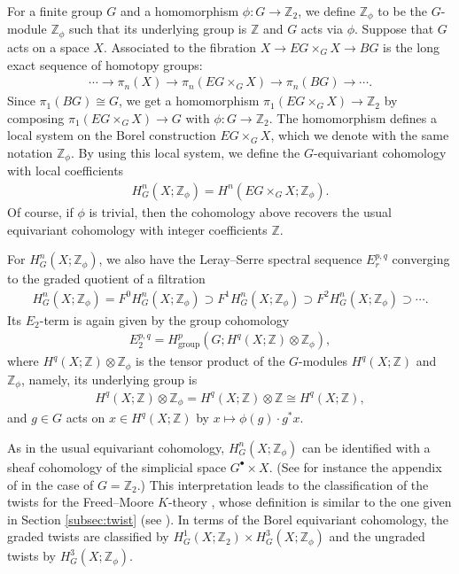 \documentclass[pdftex]{sigma}
\theoremstyle{definition}
\newcommand{\Z}{\mathbb{Z}}
\begin{document}
For a f\/inite group $G$ and a homomorphism $\phi \colon G \to \Z_2$, we def\/ine $\Z_\phi$ to be the $G$-module $\Z_\phi$ such that its underlying group is $\Z$ and $G$ acts via $\phi$. Suppose that $G$ acts on a space $X$. Associated to the f\/ibration $X \to EG \times_G X \to BG$ is the long exact sequence of homotopy groups:
\begin{gather*}
\cdots \to \pi_n(X) \to \pi_n(EG \times_G X) \to \pi_n(BG) \to \cdots.
\end{gather*}
Since $\pi_1(BG) \cong G$, we get a homomorphism $\pi_1(EG \times_G X) {\to} \Z_2$ by composing \mbox{$\pi_1(EG \times_G X) {\to} G$} with $\phi \colon G \to \Z_2$. The homomorphism def\/ines a local system on the Borel construction $EG \times_G X$, which we denote with the same notation $\Z_\phi$. By using this local system, we def\/ine the $G$-equivariant cohomology with local coef\/f\/icients
\begin{gather*}
H^n_G(X; \Z_\phi) = H^n(EG \times_G X; \Z_\phi).
\end{gather*}
Of course, if $\phi$ is trivial, then the cohomology above recovers the usual equivariant cohomology with integer coef\/f\/icients $\Z$.

For $H^n_G(X; \Z_\phi)$, we also have the Leray--Serre spectral sequence $E_r^{p, q}$ converging to the graded quotient of a f\/iltration
\begin{gather*}
H^n_G(X; \Z_\phi) = F^0H^n_G(X; \Z_\phi) \supset
F^1H^n_G(X; \Z_\phi) \supset F^2H^n_G(X; \Z_\phi) \supset \cdots.
\end{gather*}
Its $E_2$-term is again given by the group cohomology
\begin{gather*}
E_2^{p, q} = H^p_{\mathrm{group}}(G; H^q(X; \Z) \otimes \Z_\phi),
\end{gather*}
where $H^q(X; \Z) \otimes \Z_\phi$ is the tensor product of the $G$-modules $H^q(X; \Z)$ and $\Z_\phi$, namely, its underlying group is
\begin{gather*}
H^q(X; \Z) \otimes \Z_\phi = H^q(X; \Z) \otimes \Z
\cong H^q(X; \Z),
\end{gather*}
and $g \in G$ acts on $x \in H^q(X; \Z)$ by $x \mapsto \phi(g) \cdot g^*x$.

As in the usual equivariant cohomology, $H^n_G(X; \Z_\phi)$ can be identif\/ied with a sheaf cohomology of the simplicial space $G^\bullet \times X$. (See for instance the appendix of \cite{G} in the case of $G = \Z_2$.) This interpretation leads to the classif\/ication of the twists for the Freed--Moore $K$-theory \cite{F-M}, whose def\/inition is similar to the one given in Section \ref{subsec:twist} (see \cite{Ku}). In terms of the Borel equivariant cohomology, the graded twists are classif\/ied by $H^1_G(X; \Z_2) \times H^3_G(X; \Z_\phi)$ and the ungraded twists by $H^3_G(X; \Z_\phi)$.
\end{document}
